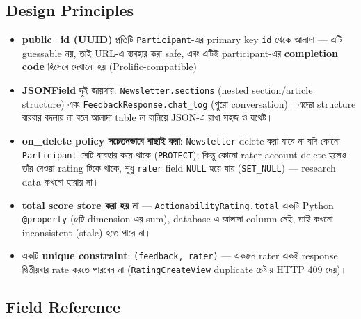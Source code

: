 \documentclass[11pt,a4paper]{article}
\newcommand{\code}[1]{\texttt{\small #1}}
\begin{document}
\subsection{Design Principles}
\begin{itemize}
\item \textbf{public\_id (UUID)} প্রতিটি \code{Participant}-এর primary key \code{id} থেকে
  আলাদা --- এটি guessable নয়, তাই URL-এ ব্যবহার করা safe, এবং এটিই participant-এর
  \textbf{completion code} হিসেবে দেখানো হয় (Prolific-compatible)।
\item \textbf{JSONField} দুই জায়গায়: \code{Newsletter.sections} (nested section/article
  structure) এবং \code{FeedbackResponse.chat\_log} (পুরো conversation)। এদের structure
  বারবার বদলায় না বলে আলাদা table না বানিয়ে JSON-এ রাখা সহজ ও যথেষ্ট।
\item \textbf{on\_delete policy সচেতনভাবে বাছাই করা}: \code{Newsletter} delete করা যাবে না যদি
  কোনো \code{Participant} সেটি ব্যবহার করে থাকে (\code{PROTECT}); কিন্তু কোনো rater account
  delete হলেও তাঁর দেওয়া rating টিকে থাকে, শুধু \code{rater} field \code{NULL} হয়ে যায়
  (\code{SET\_NULL}) --- research data কখনো হারায় না।
\item \textbf{total score store করা হয় না} --- \code{ActionabilityRating.total} একটি Python
  \code{@property} (৫টি dimension-এর sum), database-এ আলাদা column নেই, তাই কখনো
  inconsistent (stale) হতে পারে না।
\item একটি \textbf{unique constraint}: \code{(feedback, rater)} --- একজন rater একই response
  দ্বিতীয়বার rate করতে পারবেন না (\code{RatingCreateView} duplicate চেষ্টায় HTTP 409 দেয়)।
\end{itemize}

\subsection{Field Reference}
\end{document}
